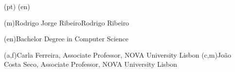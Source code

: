 
\ntsponsors(pt){}
\ntsponsors(en){}

\ntauthorname(m){Rodrigo Jorge Ribeiro}{Rodrigo Ribeiro}

\ntauthordegree(en){Bachelor Degree in Computer Science}


(a,f){Carla Ferreira, Associate Professor, NOVA University Lisbon}
(c,m){João Costa Seco, Associate Professor, NOVA University Lisbon}

